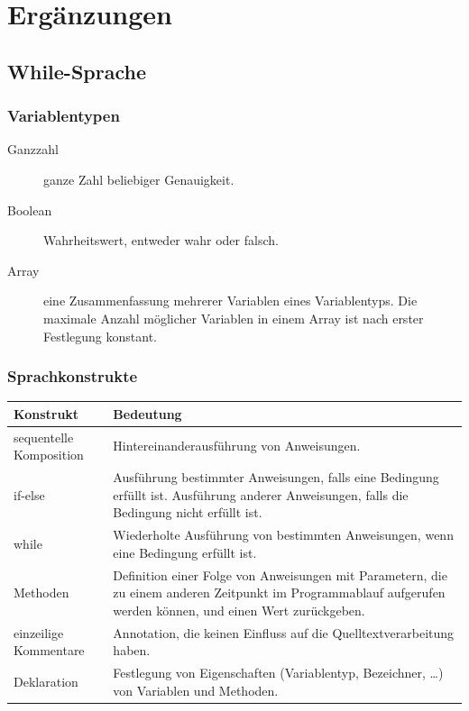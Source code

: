 \documentclass[a4paper,10pt]{article}
\begin{document}
\section{Erg\"{a}nzungen}
\subsection{While-Sprache}
\subsubsection{Variablentypen}
\begin{description}
\item[Ganzzahl] ganze Zahl beliebiger Genauigkeit.
\item[Boolean] Wahrheitswert, entweder wahr oder falsch.
\item[Array] eine Zusammenfassung mehrerer Variablen eines Variablentyps. Die maximale Anzahl m\"{o}glicher Variablen in einem Array ist nach erster Festlegung konstant.
\end{description}
\subsubsection{Sprachkonstrukte}
\begin{tabularx}{\textwidth}{| l | X |}
\hline
\textbf{Konstrukt} & \textbf{Bedeutung}\\
\hline
sequentelle Komposition & Hintereinanderausführung von Anweisungen.\\
\hline
if-else & Ausf\"{u}hrung bestimmter Anweisungen, falls eine Bedingung erf\"{u}llt ist. Ausf\"{u}hrung anderer Anweisungen, falls die Bedingung nicht erf\"{u}llt ist.\\
\hline
while & Wiederholte Ausf\"{u}hrung von bestimmten Anweisungen, wenn eine Bedingung erf\"{u}llt ist.\\
\hline
Methoden & Definition einer Folge von Anweisungen mit Parametern, die zu einem anderen Zeitpunkt im Programmablauf aufgerufen werden k\"{o}nnen, und einen Wert zur\"{u}ckgeben.\\
\hline
einzeilige Kommentare & Annotation, die keinen Einfluss auf die Quelltextverarbeitung haben.\\
\hline
Deklaration & Festlegung von Eigenschaften (Variablentyp, Bezeichner, \ldots) von Variablen und Methoden.\\
\hline
\end{tabularx}
\end{document}
